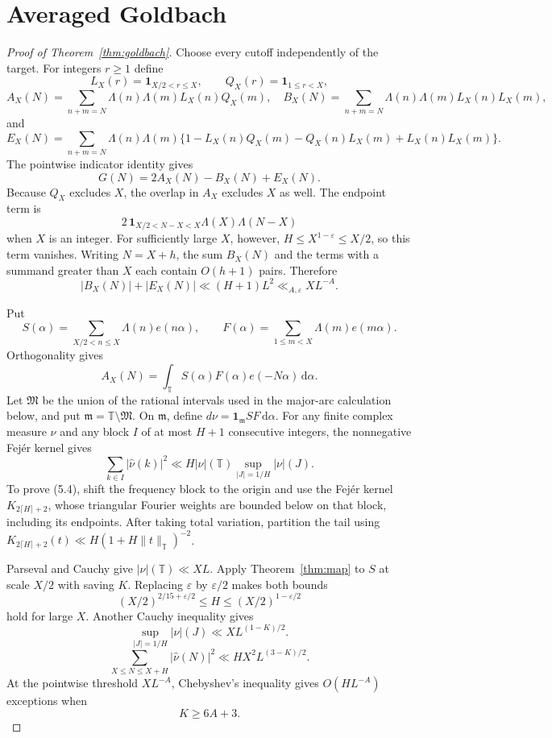 \documentclass[11pt]{article}
\theoremstyle{remark}
\newcommand{\T}{\mathbb T}
\newcommand{\M}{\mathfrak M}
\newcommand{\m}{\mathfrak m}
\newcommand{\eps}{\varepsilon}
\newcommand{\1}{\mathbf 1}
\newcommand{\dd}{\,\mathrm d}
\begin{document}
\section{Averaged Goldbach}
\begin{proof}[Proof of Theorem~\ref{thm:goldbach}]
Choose every cutoff independently of the target.  For integers $r\ge1$ define
\[
 L_X(r)=\1_{X/2<r\le X},\qquad Q_X(r)=\1_{1\le r<X},
\]
\[
 A_X(N)=\sum_{n+m=N}\Lambda(n)\Lambda(m)L_X(n)Q_X(m),
\quad
 B_X(N)=\sum_{n+m=N}\Lambda(n)\Lambda(m)L_X(n)L_X(m),
\]
and
\[
 E_X(N)=\sum_{n+m=N}\Lambda(n)\Lambda(m)
 \{1-L_X(n)Q_X(m)-Q_X(n)L_X(m)+L_X(n)L_X(m)\}.
\]
The pointwise indicator identity gives
\[
 G(N)=2A_X(N)-B_X(N)+E_X(N).                            \tag{5.1}
\]
Because \(Q_X\) excludes \(X\), the overlap in \(A_X\) excludes \(X\) as
well.  The endpoint term is
\[
 2\,\1_{X/2<N-X<X}\Lambda(X)\Lambda(N-X)
\]
when $X$ is an integer.  For sufficiently large $X$, however,
$H\le X^{1-\eps}\le X/2$, so this term vanishes.  Writing $N=X+h$, the sum
\(B_X(N)\) and the terms with a summand greater than \(X\) each contain
$O(h+1)$ pairs.  Therefore
\[
 |B_X(N)|+|E_X(N)|\ll(H+1)L^2\ll_{A,\eps}XL^{-A}.       \tag{5.2}
\]

Put
\[
 S(\alpha)=\sum_{X/2<n\le X}\Lambda(n)e(n\alpha),\qquad
 F(\alpha)=\sum_{1\le m<X}\Lambda(m)e(m\alpha).
\]
Orthogonality gives
\[
 A_X(N)=\int_\T S(\alpha)F(\alpha)e(-N\alpha)\dd\alpha.\tag{5.3}
\]
Let \(\M\) be the union of the rational intervals used in the major-arc
calculation below, and put \(\m=\T\setminus\M\).  On \(\m\), define
$d\nu=\1_\m SF\dd\alpha$.  For any finite complex measure $\nu$ and any
block $I$ of at most $H+1$ consecutive integers, the nonnegative Fejér kernel
gives
\[
 \sum_{k\in I}|\widehat\nu(k)|^2
 \ll H|\nu|(\T)\sup_{|J|=1/H}|\nu|(J).                \tag{5.4}
\]
To prove (5.4), shift the frequency block to the origin and use the Fej\'er
kernel $K_{2\lceil H\rceil+2}$, whose triangular Fourier weights are bounded
below on that block, including its endpoints.  After taking total variation,
partition the tail using
$K_{2\lceil H\rceil+2}(t)\ll H(1+H\|t\|_\T)^{-2}$.

Parseval and Cauchy give $|\nu|(\T)\ll XL$.  Apply
Theorem~\ref{thm:map} to $S$ at scale $X/2$ with saving $K$.  Replacing
$\eps$ by $\eps/2$ makes both bounds
\[
 (X/2)^{2/15+\eps/2}\le H\le(X/2)^{1-\eps/2}
\]
hold for large $X$.  Another Cauchy inequality gives
\[
 \sup_{|J|=1/H}|\nu|(J)\ll XL^{(1-K)/2}.
\]
\[
 \sum_{X\le N\le X+H}|\widehat\nu(N)|^2
 \ll HX^2L^{(3-K)/2}.                                  \tag{5.5}
\]
At the pointwise threshold $XL^{-A}$, Chebyshev's inequality gives
$O(HL^{-A})$ exceptions when
\[
 K\ge6A+3.                                             \tag{5.6}
\]


\end{proof}
\end{document}
